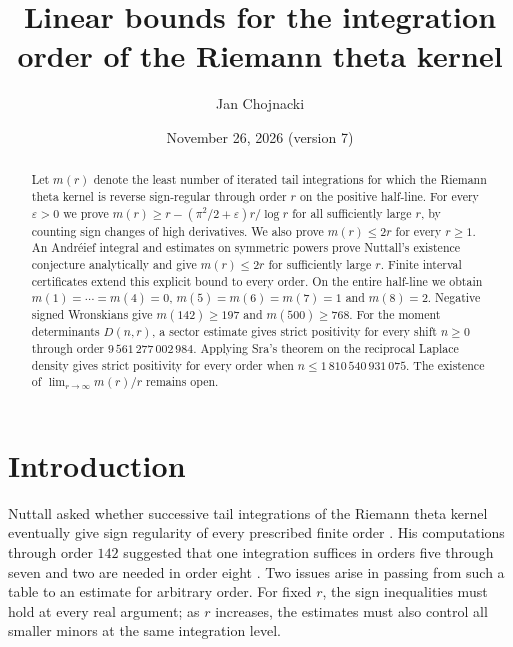 \documentclass[11pt,a4paper,reqno]{amsart}
\title[Integration order of the Riemann theta kernel]{Linear bounds for the integration order of the Riemann theta kernel}
\author{Jan Chojnacki}
\date{November 26, 2026 (version 7)}
\numberwithin{equation}{section}
\begin{document}
\begin{abstract}

Let \(m(r)\) denote the least number of iterated tail integrations for which the Riemann theta kernel is reverse sign-regular through order \(r\) on the positive half-line. For every \(\varepsilon>0\) we prove \(m(r)\ge r-(\pi^2/2+\varepsilon)r/\log r\) for all sufficiently large \(r\), by counting sign changes of high derivatives. We also prove \(m(r)\le2r\) for every \(r\ge1\). An Andréief integral and estimates on symmetric powers prove Nuttall's existence conjecture analytically and give \(m(r)\le2r\) for sufficiently large \(r\). Finite interval certificates extend this explicit bound to every order. On the entire half-line we obtain \(m(1)=\cdots=m(4)=0\), \(m(5)=m(6)=m(7)=1\) and \(m(8)=2\). Negative signed Wronskians give \(m(142)\ge197\) and \(m(500)\ge768\). For the moment determinants \(D(n,r)\), a sector estimate gives strict positivity for every shift \(n\ge0\) through order \(9\,561\,277\,002\,984\). Applying Sra's theorem on the reciprocal Laplace density gives strict positivity for every order when \(n\le1\,810\,540\,931\,075\). The existence of \(\lim_{r\to\infty}m(r)/r\) remains open.

\end{abstract}

\maketitle

\section{Introduction}\label{sec:intro}


Nuttall asked whether successive tail integrations of the Riemann theta kernel eventually give sign regularity of every prescribed finite order \cite[Conjecture~1]{nuttall}. His computations through order \(142\) suggested that one integration suffices in orders five through seven and two are needed in order eight \cite[\S4.7]{nuttall}. Two issues arise in passing from such a table to an estimate for arbitrary order. For fixed \(r\), the sign inequalities must hold at every real argument; as \(r\) increases, the estimates must also control all smaller minors at the same integration level.
\end{document}
